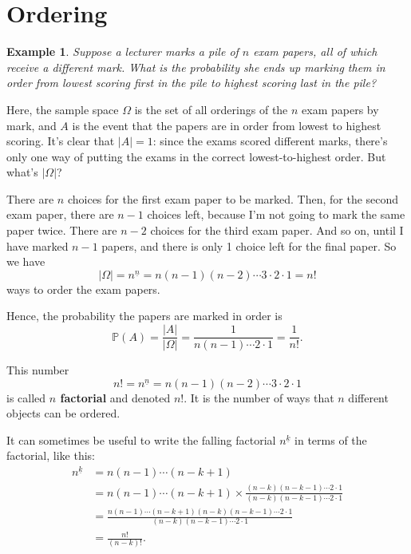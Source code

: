 \documentclass[
  a4paper,
]{book}
\theoremstyle{definition}
\theoremstyle{definition}
\newtheorem{example}{Example}[chapter]
\theoremstyle{definition}
\theoremstyle{definition}
\theoremstyle{remark}
\begin{document}
\hypertarget{ordering}{%
\section{Ordering}\label{ordering}}

\begin{example}
\emph{Suppose a lecturer marks a pile of \(n\) exam papers, all of which receive a different mark. What is the probability she ends up marking them in order from lowest scoring first in the pile to highest scoring last in the pile?}

Here, the sample space \(\Omega\) is the set of all orderings of the \(n\) exam papers by mark, and \(A\) is the event that the papers are in order from lowest to highest scoring. It's clear that \(|A| = 1\): since the exams scored different marks, there's only one way of putting the exams in the correct lowest-to-highest order. But what's \(|\Omega|\)?

There are \(n\) choices for the first exam paper to be marked. Then, for the second exam paper, there are \(n - 1\) choices left, because I'm not going to mark the same paper twice. There are \(n-2\) choices for the third exam paper. And so on, until I have marked \(n-1\) papers, and there is only 1 choice left for the final paper. So we have
\[ |\Omega| = {n}^{\underline{n}} = n(n-1)(n-2)\cdots3\cdot2\cdot1 = n! \]
ways to order the exam papers.

Hence, the probability the papers are marked in order is
\[ \mathbb P(A) = \frac{|A|}{|\Omega|} = \frac{1}{n(n-1)\cdots2\cdot1} = \frac{1}{n!} . \]
\end{example}

This number
\[ n! = {n}^{\underline{n}} = n(n-1)(n-2)\cdots3\cdot2\cdot1 \]
is called \textbf{\(n\) factorial} and denoted \(n!\). It is the number of ways that \(n\) different objects can be ordered.

It can sometimes be useful to write the falling factorial \({n}^{\underline{k}}\) in terms of the factorial, like this:
\begin{align*}
{n}^{\underline{k}} &= n(n-1)\cdots(n-k+1) \\
  &= n(n-1)\cdots(n-k+1)\times\frac{(n-k)(n-k-1)\cdots2\cdot1}{(n-k)(n-k-1)\cdots2\cdot1} \\
  &= \frac{n(n-1)\cdots(n-k+1)(n-k)(n-k-1)\cdots2\cdot1}{(n-k)(n-k-1)\cdots2\cdot1} \\
  &= \frac{n!}{(n-k)!}.
\end{align*}
\end{document}
